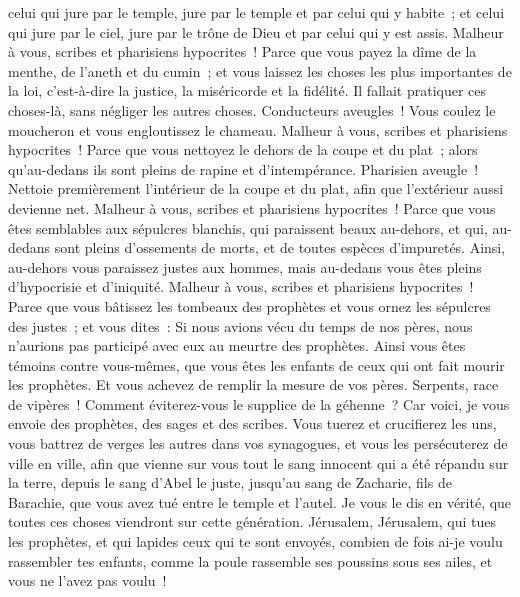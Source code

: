 \begin{multicols}{2}
celui qui jure par le temple, jure par le temple et par celui qui y habite~;
et celui qui jure par le ciel, jure par le trône de Dieu et par celui qui y est assis.
Malheur à vous, scribes et pharisiens hypocrites~! Parce que vous payez la dîme de la menthe, de l'aneth et du cumin~; et vous laissez les choses les plus importantes de la loi, c'est-à-dire la justice, la miséricorde et la fidélité. Il fallait pratiquer ces choses-là, sans négliger les autres choses.
Conducteurs aveugles~! Vous coulez le moucheron et vous engloutissez le chameau.
Malheur à vous, scribes et pharisiens hypocrites~! Parce que vous nettoyez le dehors de la coupe et du plat~; alors qu'au-dedans ils sont pleins de rapine et d'intempérance.
Pharisien aveugle~! Nettoie premièrement l'intérieur de la coupe et du plat, afin que l'extérieur aussi devienne net.
Malheur à vous, scribes et pharisiens hypocrites~! Parce que vous êtes semblables aux sépulcres blanchis, qui paraissent beaux au-dehors, et qui, au-dedans sont pleins d'ossements de morts, et de toutes espèces d'impuretés.
Ainsi, au-dehors vous paraissez justes aux hommes, mais au-dedans vous êtes pleins d'hypocrisie et d'iniquité.
Malheur à vous, scribes et pharisiens hypocrites~! Parce que vous bâtissez les tombeaux des prophètes et vous ornez les sépulcres des justes~;
et vous dites~: Si nous avions vécu du temps de nos pères, nous n'aurions pas participé avec eux au meurtre des prophètes.
Ainsi vous êtes témoins contre vous-mêmes, que vous êtes les enfants de ceux qui ont fait mourir les prophètes.
Et vous achevez de remplir la mesure de vos pères.
Serpents, race de vipères~! Comment éviterez-vous le supplice de la géhenne~?
Car voici, je vous envoie des prophètes, des sages et des scribes. Vous tuerez et crucifierez les uns, vous battrez de verges les autres dans vos synagogues, et vous les persécuterez de ville en ville,
afin que vienne sur vous tout le sang innocent qui a été répandu sur la terre, depuis le sang d'Abel le juste, jusqu'au sang de Zacharie, fils de Barachie, que vous avez tué entre le temple et l'autel.
Je vous le dis en vérité, que toutes ces choses viendront sur cette génération.
Jérusalem, Jérusalem, qui tues les prophètes, et qui lapides ceux qui te sont envoyés, combien de fois ai-je voulu rassembler tes enfants, comme la poule rassemble ses poussins sous ses ailes, et vous ne l'avez pas voulu~!

\end{multicols}
